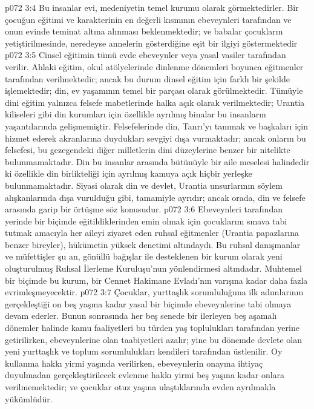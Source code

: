 \vs p072 3:4 Bu insanlar evi, medeniyetin temel kurumu olarak görmektedirler. Bir çocuğun eğitimi ve karakterinin en değerli kısmının ebeveynleri tarafından ve onun evinde teminat altına alınması beklenmektedir; ve babalar çocukların yetiştirilmesinde, neredeyse annelerin gösterdiğine eşit bir ilgiyi göstermektedir
\vs p072 3:5 Cinsel eğitimin tümü evde ebeveynler veya yasal vasiler tarafından verilir. Ahlaki eğitim, okul atölyelerinde dinlenme dönemleri boyunca eğitmenler tarafından verilmektedir; ancak bu durum dinsel eğitim için farklı bir şekilde işlemektedir; din, ev yaşamının temel bir parçası olarak görülmektedir. Tümüyle dini eğitim yalnızca felsefe mabetlerinde halka açık olarak verilmektedir; Urantia kiliseleri gibi din kurumları için özellikle ayrılmış binalar bu insanların yaşantılarında gelişmemiştir. Felsefelerinde din, Tanrı’yı tanımak ve başkaları için hizmet ederek akranlarına duydukları sevgiyi dışa vurmaktadır; ancak onların bu felsefesi, bu gezegendeki diğer milletlerin dini düzeylerine benzer bir nitelikte bulunmamaktadır. Din bu insanlar arasında bütünüyle bir aile meselesi halindedir ki özellikle din birlikteliği için ayrılmış kamuya açık hiçbir yerleşke bulunmamaktadır. Siyasi olarak din ve devlet, Urantia unsurlarının söylem alışkanlarında dışa vurulduğu gibi, tamamiyle ayrıdır; ancak orada, din ve felsefe arasında garip bir örtüşme söz konusudur.
\vs p072 3:6 Ebeveynleri tarafından yerinde bir biçimde eğitildiklerinden emin olmak için çocuklarını sınava tabi tutmak amacıyla her aileyi ziyaret eden ruhsal eğitmenler (Urantia papazlarına benzer bireyler), hükümetin yüksek denetimi altındaydı. Bu ruhsal danışmanlar ve müfettişler şu an, gönüllü bağışlar ile desteklenen bir kurum olarak yeni oluşturulmuş Ruhsal İlerleme Kuruluşu’nun yönlendirmesi altındadır. Muhtemel bir biçimde bu kurum, bir Cennet Hakimane Evladı’nın varışına kadar daha fazla evrimleşmeyecektir.
\vs p072 3:7 Çocuklar, yurttaşlık sorumluluğuna ilk adımlarının gerçekleştiği on beş yaşına kadar yasal bir biçimde ebeveynlerine tabi olmaya devam ederler. Bunun sonrasında her beş senede bir ilerleyen beş aşamalı dönemler halinde kamu faaliyetleri bu türden yaş toplulukları tarafından yerine getirilirken, ebeveynlerine olan taabiyetleri azalır; yine bu dönemde devlete olan yeni yurttaşlık ve toplum sorumlulukları kendileri tarafından üstlenilir. Oy kullanma hakkı yirmi yaşında verilirken, ebeveynlerin onayına ihtiyaç duyulmadan gerçekleştirilecek evlenme hakkı yirmi beş yaşına kadar onlara verilmemektedir; ve çocuklar otuz yaşına ulaştıklarında evden ayrılmakla yükümlüdür.
